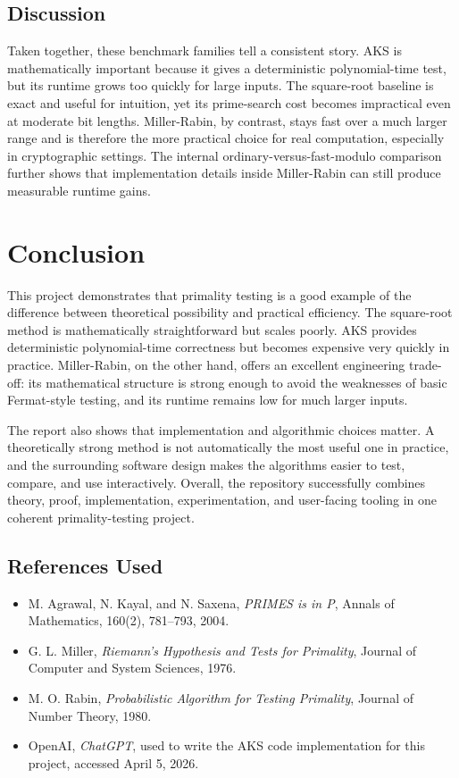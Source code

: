 \documentclass[12pt,a4paper]{report}
\begin{document}
\section{Discussion}
Taken together, these benchmark families tell a consistent story. AKS is mathematically important because it gives a deterministic polynomial-time test, but its runtime grows too quickly for large inputs. The square-root baseline is exact and useful for intuition, yet its prime-search cost becomes impractical even at moderate bit lengths. Miller-Rabin, by contrast, stays fast over a much larger range and is therefore the more practical choice for real computation, especially in cryptographic settings. The internal ordinary-versus-fast-modulo comparison further shows that implementation details inside Miller-Rabin can still produce measurable runtime gains.

\chapter{Conclusion}
This project demonstrates that primality testing is a good example of the difference between theoretical possibility and practical efficiency. The square-root method is mathematically straightforward but scales poorly. AKS provides deterministic polynomial-time correctness but becomes expensive very quickly in practice. Miller-Rabin, on the other hand, offers an excellent engineering trade-off: its mathematical structure is strong enough to avoid the weaknesses of basic Fermat-style testing, and its runtime remains low for much larger inputs.

The report also shows that implementation and algorithmic choices matter. A theoretically strong method is not automatically the most useful one in practice, and the surrounding software design makes the algorithms easier to test, compare, and use interactively. Overall, the repository successfully combines theory, proof, implementation, experimentation, and user-facing tooling in one coherent primality-testing project.

\section*{References Used}
\begin{itemize}
    \item M. Agrawal, N. Kayal, and N. Saxena, \textit{PRIMES is in P}, Annals of Mathematics, 160(2), 781--793, 2004.
    \item G. L. Miller, \textit{Riemann's Hypothesis and Tests for Primality}, Journal of Computer and System Sciences, 1976.
    \item M. O. Rabin, \textit{Probabilistic Algorithm for Testing Primality}, Journal of Number Theory, 1980.
    \item OpenAI, \textit{ChatGPT}, used to write the AKS code implementation for this project, accessed April 5, 2026.
\end{itemize}
\end{document}
